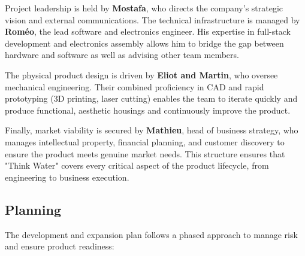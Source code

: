 \documentclass{article}
\begin{document}
Project leadership is held by \textbf{Mostafa}, who directs the company's strategic vision and external communications. The technical infrastructure is managed by \textbf{Roméo}, the lead software and electronics engineer. His expertise in full-stack development and electronics assembly allows him to bridge the gap between hardware and software as well as advising other team members.

The physical product design is driven by \textbf{Eliot and Martin}, who oversee mechanical engineering. Their combined proficiency in CAD and rapid prototyping (3D printing, laser cutting) enables the team to iterate quickly and produce functional, aesthetic housings and continuously improve the product.

Finally, market viability is secured by \textbf{Mathieu}, head of business strategy, who manages intellectual property, financial planning, and customer discovery to ensure the product meets genuine market needs. This structure ensures that "Think Water" covers every critical aspect of the product lifecycle, from engineering to business execution.

\subsection{Planning}
\label{FinalProduct}
The development and expansion plan follows a phased approach to manage risk and ensure product readiness:
\end{document}
